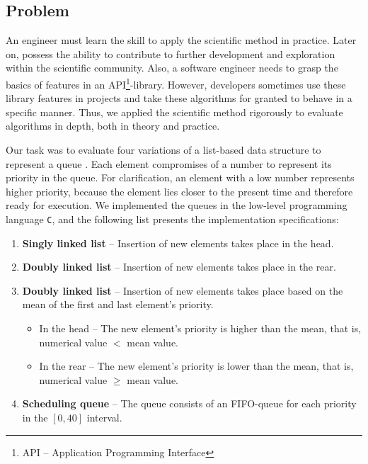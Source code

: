 \documentclass[a4paper,11pt]{kth-mag}
\newcommand*{\skippara}{\par\vspace{\baselineskip} \noindent}
\begin{document}
\subsection{Problem}\label{sec:problem}
\skippara An engineer must learn the skill to apply the scientific method in practice.
Later on, possess the ability to contribute to further development and exploration within the scientific community.
Also, a software engineer needs to grasp the basics of features in an API\footnote{API -- Application Programming Interface}-library.
However, developers sometimes use these library features in projects and take these algorithms for granted to behave in a specific manner.
Thus, we applied the scientific method rigorously to evaluate algorithms in depth, both in theory and practice.

\skippara Our task was to evaluate four variations of a list-based data structure to represent a queue \cite{Uppgiftl9:online}.
Each element compromises of a number to represent its priority in the queue.
For clarification, an element with a low number represents higher priority, because the element lies closer to the present time and therefore ready for execution.
We implemented the queues in the low-level programming language \texttt{C}, and the following list presents the implementation specifications:
\begin{enumerate}
    \item \textbf{Singly linked list} -- Insertion of new elements takes place in the head.
    \item \textbf{Doubly linked list} -- Insertion of new elements takes place in the rear.
    \item \textbf{Doubly linked list} -- Insertion of new elements takes place based on the mean of the first and last element's priority.
        \begin{itemize}
            \item In the head -- The new element's priority is higher than the mean, that is, \\numerical value $<$ mean value.
            \item In the rear -- The new element's priority is lower than the mean, that is,\\numerical value $\ge$ mean value.
        \end{itemize}
    \item \textbf{Scheduling queue} -- The queue consists of an FIFO-queue for each priority in the $[0,40]$ interval.
\end{enumerate}
\end{document}
